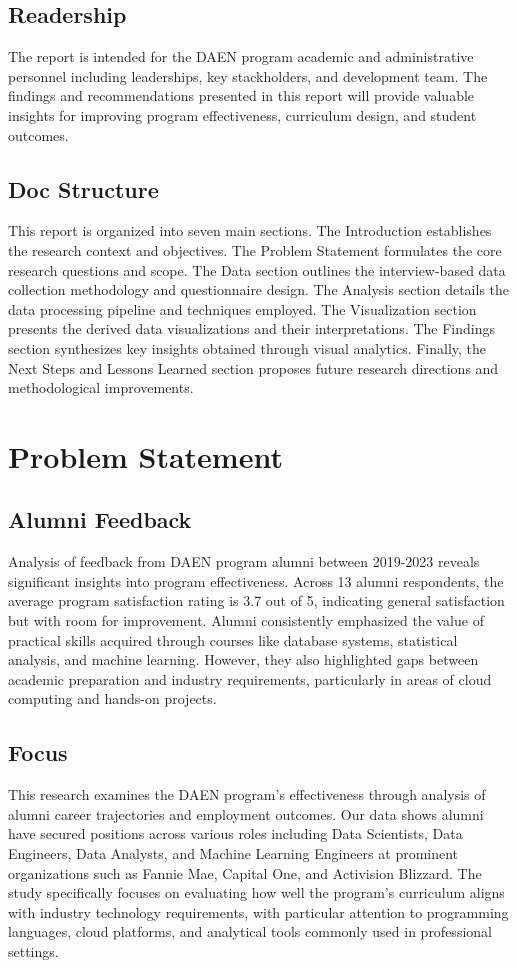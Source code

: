 \documentclass[12pt,a4paper]{article}
\begin{document}
\subsection{Readership}
The report is intended for the DAEN program academic and 
administrative personnel including leaderships, key stackholders, 
and development team. The findings and recommendations presented 
in this report will provide valuable insights for improving program 
effectiveness, curriculum design, and student outcomes.

\subsection{Doc Structure}
This report is organized into seven main sections. The Introduction 
establishes the research context and objectives. The Problem 
Statement formulates the core research questions and scope. 
The Data section outlines the interview-based data collection 
methodology and questionnaire design. The Analysis section 
details the data processing pipeline and techniques employed. 
The Visualization section presents the derived data visualizations 
and their interpretations. The Findings section synthesizes key 
insights obtained through visual analytics. Finally, the Next 
Steps and Lessons Learned section proposes future research 
directions and methodological improvements.

\section{Problem Statement}
\subsection{Alumni Feedback}
Analysis of feedback from DAEN program alumni between 2019-2023 reveals significant insights into program effectiveness. Across 13 alumni respondents, the average program satisfaction rating is 3.7 out of 5, indicating general satisfaction but with room for improvement. Alumni consistently emphasized the value of practical skills acquired through courses like database systems, statistical analysis, and machine learning. However, they also highlighted gaps between academic preparation and industry requirements, particularly in areas of cloud computing and hands-on projects.

\subsection{Focus}
This research examines the DAEN program's effectiveness through analysis of alumni career trajectories and employment outcomes. Our data shows alumni have secured positions across various roles including Data Scientists, Data Engineers, Data Analysts, and Machine Learning Engineers at prominent organizations such as Fannie Mae, Capital One, and Activision Blizzard. The study specifically focuses on evaluating how well the program's curriculum aligns with industry technology requirements, with particular attention to programming languages, cloud platforms, and analytical tools commonly used in professional settings.
\end{document}
